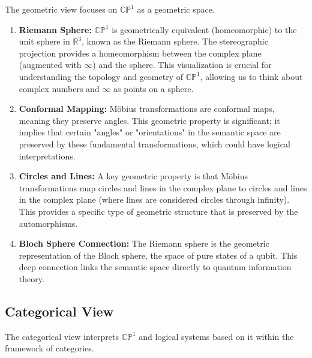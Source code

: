 \documentclass{article}
\begin{document}
	The geometric view focuses on $\mathbb{CP}^1$ as a geometric space.
	
	\begin{enumerate}
		\item \textbf{Riemann Sphere:} $\mathbb{CP}^1$ is geometrically equivalent (homeomorphic) to the unit sphere in $\mathbb{R}^3$, known as the Riemann sphere. The stereographic projection provides a homeomorphism between the complex plane (augmented with $\infty$) and the sphere. This visualization is crucial for understanding the topology and geometry of $\mathbb{CP}^1$, allowing us to think about complex numbers and $\infty$ as points on a sphere.
		
		\item \textbf{Conformal Mapping:} M\"{o}bius transformations are conformal maps, meaning they preserve angles. This geometric property is significant; it implies that certain "angles" or "orientations" in the semantic space are preserved by these fundamental transformations, which could have logical interpretations.
		
		\item \textbf{Circles and Lines:} A key geometric property is that M\"{o}bius transformations map circles and lines in the complex plane to circles and lines in the complex plane (where lines are considered circles through infinity). This provides a specific type of geometric structure that is preserved by the automorphisms.
		
		\item \textbf{Bloch Sphere Connection:} The Riemann sphere is the geometric representation of the Bloch sphere, the space of pure states of a qubit. This deep connection links the semantic space directly to quantum information theory.
	\end{enumerate}
	
	\subsection{Categorical View}
	
	The categorical view interprets $\mathbb{CP}^1$ and logical systems based on it within the framework of categories.
	
\end{document}
